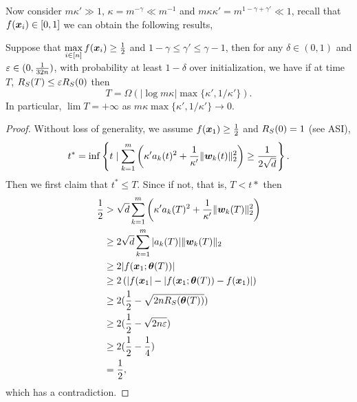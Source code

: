 \documentclass{article}
\begin{document}
Now consider $m\kappa'\gg 1$, $\kappa=m^{-\gamma}\ll m^{-1}$ and $m\kappa\kappa'=m^{1-\gamma+\gamma'}\ll 1$, recall that $f(\bm{x}_i)\in[0,1]$ we can obtain the following results,
\begin{thm}
    Suppose that $\max\limits_{i\in[n]}f(\bm{x}_i)\geq\frac{1}{2}$ and $1-\gamma\leq\gamma'\leq\gamma-1$, then for any $\delta\in(0,1)$ and $\varepsilon\in(0,\frac{1}{32n})$, with probability at least $1-\delta$ over initialization, we have if at time $T$, $R_S(T)\leq\varepsilon R_S(0)$ then
    \begin{equation}
        T=\Omega(|\log m\kappa|\max\{\kappa',1/\kappa'\}).
    \end{equation}
    In particular, $\lim T=+\infty$ as $m\kappa\max\{\kappa',1/\kappa'\}\to 0$.
\end{thm}
\begin{proof}
    Without loss of generality, we assume $f(\bm{x}_1)\geq\frac{1}{2}$ and $R_S(0)=1$ (see ASI),
    \begin{equation}
        t^*=\inf\left\{t\mid \sum_{k=1}^m\left(\kappa' a_k(t)^2 + \frac{1}{\kappa'}\lVert\bm{w}_k(t)\rVert_2^2\right)\geq\frac{1}{2\sqrt{d}}\right\}.
    \end{equation}
    Then we first claim that $t^*\leq T$. Since if not, that is, $T<t*$ then
    \begin{equation}
        \begin{aligned}
            \frac{1}{2}
             & >\sqrt{d}\sum_{k=1}^m\left(\kappa' a_k(T)^2+\frac{1}{\kappa'}\lVert\bm{w}_k(T)\rVert^2_2\right) \\
             & \geq 2\sqrt{d}\sum_{k=1}^m|a_k(T)|\lVert\bm{w}_k(T)\rVert_2                                     \\
             & \geq 2|f(\bm{x}_1;\bm{\theta}(T))|                                                             \\
             & \geq 2\left(|f(\bm{x}_1|-|f(\bm{x}_1;\bm{\theta}(T))-f(\bm{x}_1)|\right)                             \\
             & \geq 2(\frac{1}{2}-\sqrt{2nR_S(\bm{\theta}(T))})                                            \\
             & \geq 2(\frac{1}{2}-\sqrt{2n\varepsilon})                                                       \\
             & \geq 2(\frac{1}{2}-\frac{1}{4})                                                         \\
             & =\frac{1}{2},
        \end{aligned}
    \end{equation}
    which has a contradiction.
\end{proof}
\end{document}
